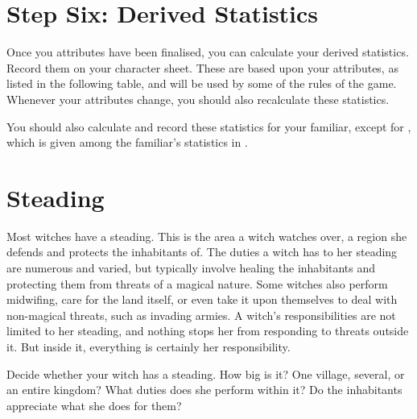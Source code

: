 \section{Step Six: Derived Statistics}

Once you attributes have been finalised, you can calculate your derived statistics.
Record them on your character sheet.
These are based upon your attributes, as listed in the following table, and will be used by some of the rules of the game.
Whenever your attributes change, you should also recalculate these statistics.

You should also calculate and record these statistics for your familiar, except for , which is given among the familiar's statistics in .


\section{Steading}

Most witches have a steading.
This is the area a witch watches over, a region she defends and protects the inhabitants of.
The duties a witch has to her steading are numerous and varied, but typically involve healing the inhabitants and protecting them from threats of a magical nature.
Some witches also perform midwifing, care for the land itself, or even take it upon themselves to deal with non-magical threats, such as invading armies.
A witch's responsibilities are not limited to her steading, and nothing stops her from responding to threats outside it.
But inside it, everything is certainly her responsibility.

Decide whether your witch has a steading.
How big is it?
One village, several, or an entire kingdom?
What duties does she perform within it?
Do the inhabitants appreciate what she does for them?

